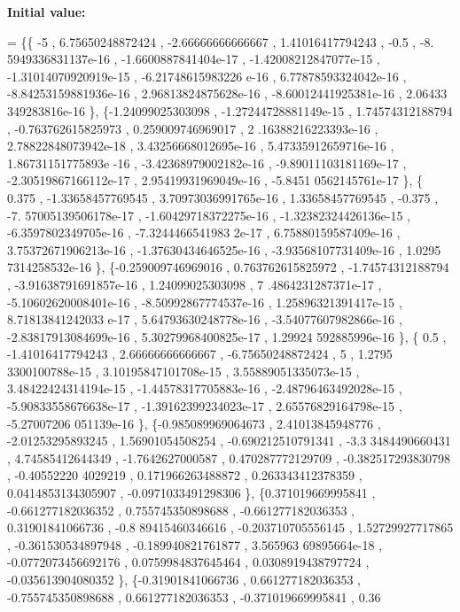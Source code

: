 {\bfseries Initial value\+:}
\begin{DoxyCode}
= \{\{               -5 ,  6.75650248872424 , -2.66666666666667 ,  1.41016417794243 ,              -0.5 , -8.
      5949336831137e-16 , -1.6600887841404e-17 , -1.42008212847077e-15 , -1.31014070920919e-15 , -6.21748615983226
      e-16 , 6.77878593324042e-16 , -8.84253159881936e-16 , 2.96813824875628e-16 , -8.60012441925381e-16 , 2.06433
      349283816e-16 \},
\{-1.24099025303098 , -1.27244728881149e-15 ,  1.74574312188794 , -0.763762615825973 , 0.259009746969017 , 2
      .16388216223393e-16 , 2.78822848073942e-18 , 3.43256668012695e-16 , 5.47335912659716e-16 , 1.86731151775893e
      -16 , -3.42368979002182e-16 , -9.89011103181169e-17 , -2.30519867166112e-17 , 2.95419931969049e-16 , -5.8451
      0562145761e-17 \},
\{            0.375 , -1.33658457769545 , 3.70973036991765e-16 ,  1.33658457769545 ,            -0.375 , -7.
      57005139506178e-17 , -1.60429718372275e-16 , -1.32382324426136e-15 , -6.3597802349705e-16 , -7.3244466541983
      2e-17 , 6.75880159587409e-16 , 3.75372671906213e-16 , -1.37630434646525e-16 , -3.93568107731409e-16 , 1.0295
      7314258532e-16 \},
\{-0.259009746969016 , 0.763762615825972 , -1.74574312188794 , -3.91638791691857e-16 ,  1.24099025303098 , 7
      .4864231287371e-17 , -5.10602620008401e-16 , -8.50992867774537e-16 , 1.25896321391417e-15 , 8.71813841242033
      e-17 , 5.64793630248778e-16 , -3.54077607982866e-16 , -2.83817913084699e-16 , 5.30279968400825e-17 , 1.29924
      592885996e-16 \},
\{              0.5 , -1.41016417794243 ,  2.66666666666667 , -6.75650248872424 ,                 5 , 1.2795
      3300100788e-15 , 3.10195847101708e-15 , 3.55889051335073e-15 , 3.48422424314194e-15 , -1.44578317705883e-16 
      , -2.48796463492028e-15 , -5.90833558676638e-17 , -1.39162399234023e-17 , 2.65576829164798e-15 , -5.27007206
      051139e-16 \},
\{-0.985089969064673 ,  2.41013845948776 , -2.01253295893245 ,  1.56901054508254 , -0.690212510791341 , -3.3
      3484490660431 ,  4.74585412644349 ,  -1.7642627000587 , 0.470287772129709 , -0.382517293830798 , -0.40552220
      4029219 , 0.171966263488872 , 0.263343412378359 , 0.0414853134305907 , -0.0971033491298306 \},
\{0.371019669995841 , -0.661277182036352 , 0.755745350898688 , -0.661277182036353 ,  0.31901841066736 , -0.8
      89415460346616 , -0.203710705556145 ,  1.52729927717865 , -0.361530534897948 , -0.189940821761877 , 3.565963
      69895664e-18 , -0.0772073456692176 , 0.0759984837645464 , 0.0308919438797724 , -0.035613904080352 \},
\{-0.31901841066736 , 0.661277182036353 , -0.755745350898688 , 0.661277182036353 , -0.371019669995841 , 0.36

\end{DoxyCode}
